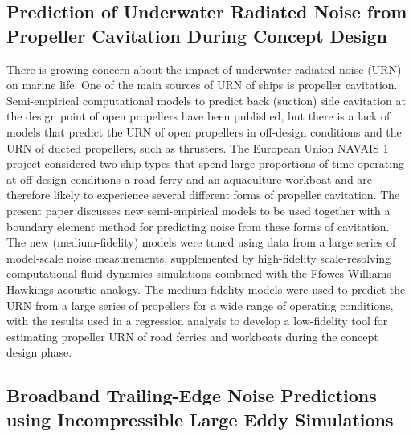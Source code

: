 \documentclass[a4paper,10pt]{article}
\begin{document}
\subsection{Prediction of Underwater Radiated Noise from Propeller Cavitation During Concept Design \cite{lafeber_prediction_2022}}

There is growing concern about the impact of underwater radiated noise (URN) on marine life. One of the main sources of URN of ships is propeller cavitation. Semi-empirical computational models to predict back (suction) side cavitation at the design point of open propellers have been published, but there is a lack of models that predict the URN of open propellers in off-design conditions and the URN of ducted propellers, such as thrusters. The European Union NAVAIS 1 project considered two ship types that spend large proportions of time operating at off-design conditions-a road ferry and an aquaculture workboat-and are therefore likely to experience several different forms of propeller cavitation. The present paper discusses new semi-empirical models to be used together with a boundary element method for predicting noise from these forms of cavitation. The new (medium-fidelity) models were tuned using data from a large series of model-scale noise measurements, supplemented by high-fidelity scale-resolving computational fluid dynamics simulations combined with the Ffowcs Williams-Hawkings acoustic analogy. The medium-fidelity models were used to predict the URN from a large series of propellers for a wide range of operating conditions, with the results used in a regression analysis to develop a low-fidelity tool for estimating propeller URN of road ferries and workboats during the concept design phase.

\subsection{Broadband Trailing-Edge Noise Predictions using Incompressible Large Eddy Simulations \cite{lloyd_broadband_2022}}
\end{document}
